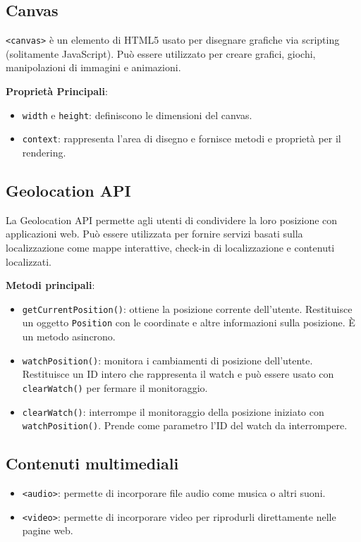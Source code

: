 \subsection{Canvas}

\texttt{<canvas>} è un elemento di HTML5 usato per disegnare grafiche via scripting (solitamente JavaScript). Può essere utilizzato per creare grafici, giochi, manipolazioni di immagini e animazioni.

\textbf{Proprietà Principali}:
\begin{itemize}
    \item \texttt{width} e \texttt{height}: definiscono le dimensioni del canvas.
    \item \texttt{context}: rappresenta l'area di disegno e fornisce metodi e proprietà per il rendering.
\end{itemize}

\subsection{Geolocation API}

La Geolocation API permette agli utenti di condividere la loro posizione con applicazioni web. Può essere utilizzata per fornire servizi basati sulla localizzazione come mappe interattive, check-in di localizzazione e contenuti localizzati.

\textbf{Metodi principali}:
\begin{itemize}
    \item \texttt{getCurrentPosition()}: ottiene la posizione corrente dell'utente. Restituisce un oggetto \texttt{Position} con le coordinate e altre informazioni sulla posizione. È un metodo asincrono.
    \item \texttt{watchPosition()}: monitora i cambiamenti di posizione dell'utente. Restituisce un ID intero che rappresenta il watch e può essere usato con \texttt{clearWatch()} per fermare il monitoraggio.
    \item \texttt{clearWatch()}: interrompe il monitoraggio della posizione iniziato con \texttt{watchPosition()}. Prende come parametro l'ID del watch da interrompere.
\end{itemize}

\subsection{Contenuti multimediali}

\begin{itemize}
    \item \texttt{<audio>}: permette di incorporare file audio come musica o altri suoni.
    \item \texttt{<video>}: permette di incorporare video per riprodurli direttamente nelle pagine web.
\end{itemize}

